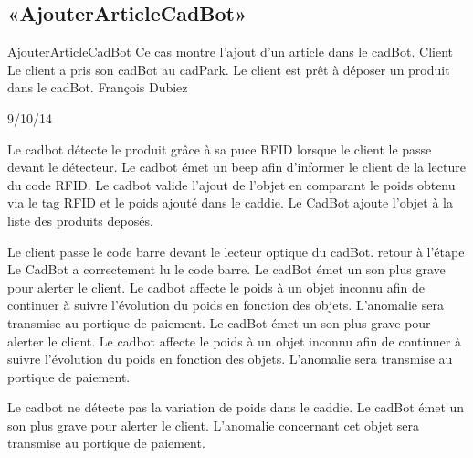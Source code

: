 \subsection[SS:CUD:AAC]{«AjouterArticleCadBot»}

\startCU
\nom AjouterArticleCadBot
\but Ce cas montre l'ajout d'un article dans le cadBot.
\acteur Client
\precondition Le client a pris son cadBot au cadPark.
\declenchement Le client est prêt à déposer un produit dans le cadBot.
\auteur François Dubiez
\date 29/10/14

\nominal %
\startnominal
\etape[AAC:SA1] Le cadbot détecte le produit grâce à sa puce RFID lorsque le client le passe devant le détecteur. 
 Le cadbot émet un beep afin d'informer le client de la lecture du code RFID.
\etape[AAC:SE1] Le cadbot valide l'ajout de l'objet en comparant le poids obtenu via le tag RFID et  le poids ajouté dans le caddie.
\stopnominal
\postcondition Le CadBot ajoute l'objet à la liste des produits deposés.

\alternatifs %
\startalternatif[AAC:SA1] %
  \etape[AAC:SE1] Le client passe le code barre devant le lecteur optique du cadBot.
  \etape retour à l'étape 
\stopcondition
\postcondition Le CadBot a correctement lu le code barre.
   \etape Le cadBot émet un son plus grave pour alerter le client.
   \etape Le cadbot affecte le poids à un objet inconnu afin de continuer à suivre l'évolution du poids en fonction des objets.
\stopcondition
\postcondition L'anomalie sera transmise au portique de paiement.
   \etape Le cadBot émet un son plus grave pour alerter le client.
   \etape Le cadbot affecte le poids à un objet inconnu afin de continuer à suivre l'évolution du poids en fonction des objets.
\stopcondition
\postcondition L'anomalie sera transmise au portique de paiement.
\stopalternatif

\startalternatif[AAC:SE1]
   \etape Le cadbot ne détecte pas la variation de poids dans le caddie.
   \etape Le cadBot émet un son plus grave pour alerter le client.
\stopcondition
\postcondition L'anomalie concernant cet objet sera transmise au portique de paiement.
\stopalternatif

\stopCU
